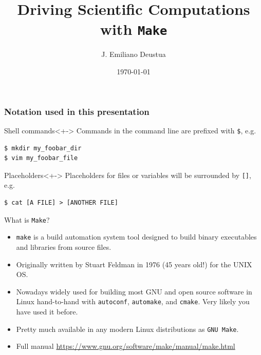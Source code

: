 \documentclass[10pt]{beamer}
\title{Driving Scientific Computations with \texttt{Make}}
\date{\today}
\author{J. Emiliano Deustua}
\institute{Miller's Group \\ Caltech}
\newcommand{\textco}[1]{\colorbox{bg_gray}{\texttt{#1}}}
\begin{document}
  \maketitle

  \begin{frame}[fragile]
    \frametitle{Notation used in this presentation}
    \begin{block}{Shell commands}<+->
      Commands in the command line are prefixed with \texttt{\$}, e.g.
\begin{lstlisting}[numbers=none,backgroundcolor=\color{gray!10}]
$ mkdir my_foobar_dir
$ vim my_foobar_file
\end{lstlisting}
    \end{block}

    \begin{block}{Placeholders}<+->
      Placeholders for files or variables will be surrounded by \texttt{[]}, e.g.
\begin{lstlisting}[numbers=none,backgroundcolor=\color{gray!10}]
$ cat [A FILE] > [ANOTHER FILE]
\end{lstlisting}
    \end{block}
  \end{frame}


  \begin{frame}{What is \texttt{Make}?}
    \begin{itemize}[<+->]
    \item \textco{make} is a \alert{build automation system tool} designed to build
      binary executables and libraries from source files.

    \item Originally written by Stuart Feldman in 1976 (\alert{45 years old!}) for the UNIX OS.

    \item Nowadays widely used for building most GNU and open source software
      in Linux hand-to-hand with \textco{autoconf}, \textco{automake}, and
      \textco{cmake}. \alert{Very likely you have used it before.}

    \item Pretty much available in any modern Linux
      distributions as \textco{GNU Make}.

    \item Full manual
      \url{https://www.gnu.org/software/make/manual/make.html}
  \end{itemize}

  \end{frame}
\end{document}
